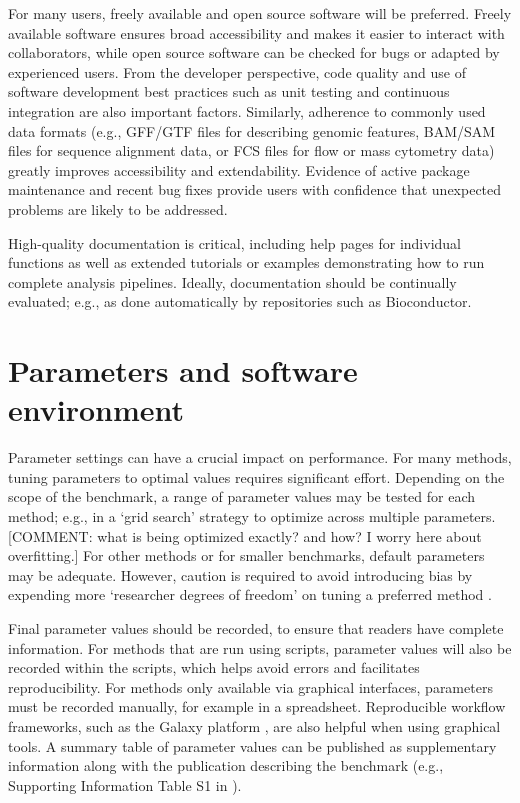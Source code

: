 \documentclass[12pt, a4paper]{article}
\begin{document}
For many users, freely available and open source software will be preferred. Freely available software ensures broad accessibility and makes it easier to interact with collaborators, while open source software can be checked for bugs or adapted by experienced users. From the developer perspective, code quality and use of software development best practices such as unit testing and continuous integration are also important factors. Similarly, adherence to commonly used data formats (e.g., GFF/GTF files for describing genomic features, BAM/SAM files for sequence alignment data, or FCS files for flow or mass cytometry data) greatly improves accessibility and extendability. Evidence of active package maintenance and recent bug fixes provide users with confidence that unexpected problems are likely to be addressed.

High-quality documentation is critical, including help pages for individual functions as well as extended tutorials or examples demonstrating how to run complete analysis pipelines. Ideally, documentation should be continually evaluated; e.g., as done automatically by repositories such as Bioconductor.




\section*{Parameters and software environment}

Parameter settings can have a crucial impact on performance. For many methods, tuning parameters to optimal values requires significant effort. Depending on the scope of the benchmark, a range of parameter values may be tested for each method; e.g., in a `grid search' strategy to optimize across multiple parameters. [COMMENT: what is being optimized exactly? and how? I worry here about overfitting.] For other methods or for smaller benchmarks, default parameters may be adequate. However, caution is required to avoid introducing bias by expending more `researcher degrees of freedom' on tuning a preferred method \citep{Hu2018b}.

Final parameter values should be recorded, to ensure that readers have complete information. For methods that are run using scripts, parameter values will also be recorded within the scripts, which helps avoid errors and facilitates reproducibility. For methods only available via graphical interfaces, parameters must be recorded manually, for example in a spreadsheet. Reproducible workflow frameworks, such as the Galaxy platform \citep{Afgan2018}, are also helpful when using graphical tools. A summary table of parameter values can be published as supplementary information along with the publication describing the benchmark (e.g., Supporting Information Table S1 in \citep{Weber2016}).
\end{document}
